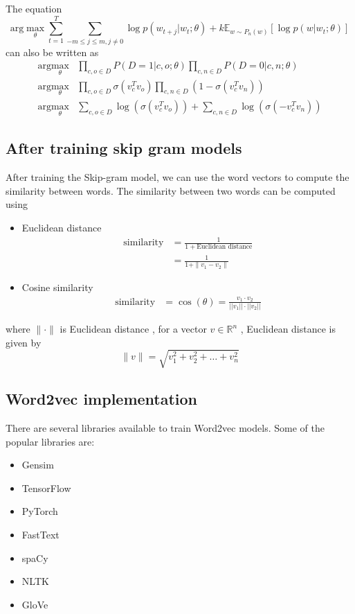 The equation $$\text{arg}\max_{\theta} \sum_{t=1}^{T} \sum_{-m \leq j \leq m, j \neq 0} \log p(w_{t+j} | w_t; \theta) + k \mathbb{E}_{w \sim P_n(w)} \left[ \log p(w | w_t; \theta) \right]$$ can also be written as
\begin{align*}
    \text{arg}\max_{\theta} & \prod_{c,o \in D} P(D = 1 | c, o; \theta) \prod_{c,n \in D} P(D = 0 | c, n; \theta) \\
    \text{arg}\max_{\theta} & \prod_{c,o \in D} \sigma(v_c^T v_o) \prod_{c,n \in D} (1- \sigma(v_c^T v_n)) \\
    \text{arg}\max_{\theta} & \sum_{c,o \in D} \log(\sigma(v_c^T v_o))  + \sum_{c,n \in D} \log(\sigma(-v_c^T v_n))
\end{align*}

\subsection{After training skip gram models}

After training the Skip-gram model, we can use the word vectors to compute the similarity between words. 
The similarity between two words can be computed using 
\begin{itemize}
    \item Euclidean distance
        \begin{align*}
            \text{similarity} &= \frac{1}{1 + \text{Euclidean distance}}\\
            &= \frac{1}{1 + \|v_1 - v_2\|}
        \end{align*}
    \item Cosine similarity
        \begin{align*}
            \text{similarity} &= \cos(\theta) = \frac{v_1 \cdot v_2}{||v_1|| \cdot ||v_2||}
        \end{align*}
\end{itemize}
where $\|\cdot\|$ is Euclidean distance , for a vector $v \in \mathbb{R}^n$ , Euclidean distance is given by 
$$  
    \|v\| = \sqrt{v_1^2 + v_2^2 + \ldots + v_n^2} 
$$

\subsection{Word2vec implementation}

There are several libraries available to train Word2vec models. Some of the popular libraries are:
\begin{itemize}
    \item Gensim
    \item TensorFlow
    \item PyTorch
    \item FastText
    \item spaCy
    \item NLTK
    \item GloVe
\end{itemize}

